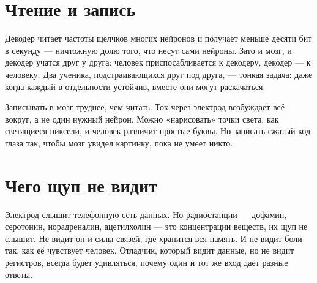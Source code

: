 \section*{Чтение и запись}

Декодер читает частоты щелчков многих нейронов и получает меньше десяти бит в секунду --- ничтожную долю того, что несут сами нейроны. Зато и мозг, и декодер учатся друг у друга: человек приспосабливается к декодеру, декодер --- к человеку. Два ученика, подстраивающихся друг под друга, --- тонкая задача: даже когда каждый в отдельности устойчив, вместе они могут раскачаться.

Записывать в мозг труднее, чем читать. Ток через электрод возбуждает всё вокруг, а не один нужный нейрон. Можно «нарисовать» точки света, как светящиеся пиксели, и человек различит простые буквы. Но записать сжатый код глаза так, чтобы мозг увидел картинку, пока не умеет никто.

\section*{Чего щуп не видит}

Электрод слышит телефонную сеть данных. Но радиостанции --- дофамин, серотонин, норадреналин, ацетилхолин --- это концентрации веществ, их щуп не слышит. Не видит он и силы связей, где хранится вся память. И не видит боли так, как её чувствует человек. Отладчик, который видит данные, но не видит регистров, всегда будет удивляться, почему один и тот же вход даёт разные ответы.

